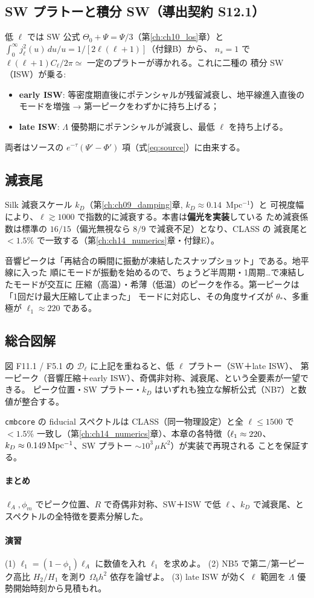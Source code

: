 \subsection{SW プラトーと積分 SW（導出契約 S12.1）}
低 $\ell$ では SW 公式 $\Theta_0+\Psi=\Psi/3$（第\ref{ch:ch10_los}章）と
$\int_0^\infty j_\ell^2(u)\,du/u=1/[2\ell(\ell+1)]$（付録B）から、
$n_s=1$ で $\ell(\ell+1)C_\ell/2\pi\simeq$ 一定のプラトーが導かれる。これに二種の
積分 SW（ISW）が乗る:
\begin{itemize}
  \item \textbf{early ISW}: 等密度期直後にポテンシャルが残留減衰し、地平線進入直後の
  モードを増強 → 第一ピークをわずかに持ち上げる；
  \item \textbf{late ISW}: $\Lambda$ 優勢期にポテンシャルが減衰し、最低 $\ell$ を持ち上げる。
\end{itemize}
両者はソースの $e^{-\tau}(\Psi'-\Phi')$ 項（式\eqref{eq:source}）に由来する。

\subsection{減衰尾}
Silk 減衰スケール $k_D$（第\ref{ch:ch09_damping}章, $k_D\approx0.14$~Mpc$^{-1}$）と
可視度幅により、$\ell\gtrsim1000$ で指数的に減衰する。本書は\textbf{偏光を実装}している
ため減衰係数は標準の $16/15$（偏光無視なら $8/9$ で減衰不足）となり、CLASS の
減衰尾と $<1.5\%$ で一致する（第\ref{ch:ch14_numerics}章・付録E）。

\begin{intuition}
音響ピークは「再結合の瞬間に振動が凍結したスナップショット」である。地平線に入った
順にモードが振動を始めるので、ちょうど半周期・1周期…で凍結したモードが交互に
圧縮（高温）・希薄（低温）のピークを作る。第一ピークは「1回だけ最大圧縮して止まった」
モードに対応し、その角度サイズが $\theta_*$、多重極が $\ell_1\approx220$ である。
\end{intuition}

\subsection{総合図解}
図 F11.1 / F5.1 の $\mathcal D_\ell$ に上記を重ねると、低 $\ell$ プラトー（SW＋late ISW）、
第一ピーク（音響圧縮＋early ISW）、奇偶非対称、減衰尾、という全要素が一望できる。
ピーク位置・SW プラトー・$k_D$ はいずれも独立な解析公式（NB7）と数値が整合する。

\begin{numreality}
\texttt{cmbcore} の fiducial スペクトルは CLASS（同一物理設定）と全 $\ell\le1500$ で
$<1.5\%$ 一致し（第\ref{ch:ch14_numerics}章）、本章の各特徴（$\ell_1\approx220$、
$k_D\approx0.149\,\mathrm{Mpc^{-1}}$、SW プラトー $\sim10^3\,\mu K^2$）が実装で再現される
ことを保証する。
\end{numreality}

\paragraph{まとめ}
$\ell_A,\phi_m$ でピーク位置、$R$ で奇偶非対称、SW＋ISW で低 $\ell$、$k_D$ で減衰尾、と
スペクトルの全特徴を要素分解した。

\paragraph{演習}
(1) $\ell_1=(1-\phi_1)\ell_A$ に数値を入れ $\ell_1$ を求めよ。
(2) NB5 で第二/第一ピーク高比 $H_2/H_1$ を測り $\Omega_bh^2$ 依存を論ぜよ。
(3) late ISW が効く $\ell$ 範囲を $\Lambda$ 優勢開始時刻から見積もれ。

